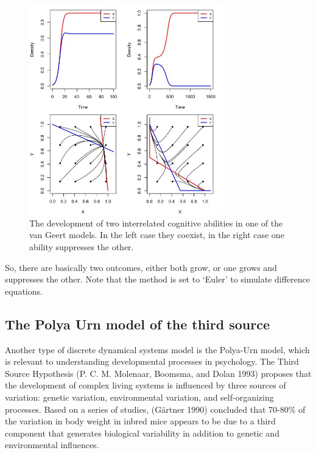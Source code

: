 \documentclass[
  letterpaper,
]{scrbook}
\begin{document}
\begin{figure}

{\centering \includegraphics[width=3.31882in,height=\textheight]{media/ch5/image11.jpg}

}

\caption{\label{fig-ch5-img11-old-59}The development of two interrelated
cognitive abilities in one of the van Geert models. In the left case
they coexist, in the right case one ability suppresses the other.}

\end{figure}

So, there are basically two outcomes, either both grow, or one grows and
suppresses the other. Note that the method is set to `Euler' to simulate
difference equations.

\hypertarget{the-polya-urn-model-of-the-third-source}{%
\subsection{The Polya Urn model of the third
source}\label{the-polya-urn-model-of-the-third-source}}

Another type of discrete dynamical systems model is the Polya-Urn model,
which is relevant to understanding developmental processes in
psychology. The Third Source Hypothesis (P. C. M. Molenaar, Boomsma, and
Dolan 1993) proposes that the development of complex living systems is
influenced by three sources of variation: genetic variation,
environmental variation, and self-organizing processes. Based on a
series of studies, (Gärtner 1990) concluded that 70-80\% of the
variation in body weight in inbred mice appears to be due to a third
component that generates biological variability in addition to genetic
and environmental influences.
\end{document}
